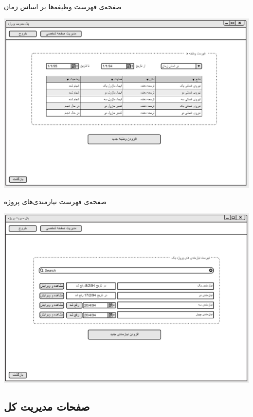 \vspace{1cm}
صفحه‌ی فهرست وظیفه‌ها بر اساس زمان
\begin{center}
\includegraphics[width=\textwidth]{Prototype/ProjectManager/ProjectTasks2.png}
\end{center}

\newpage
\vspace{1cm}
صفحه‌ی فهرست نیازمندی‌های پروژه 
\begin{center}
\includegraphics[width=\textwidth]{Prototype/ProjectManager/ProjectRequirements.png}
\end{center}

\newpage
\subsection{صفحات مدیریت کل}

